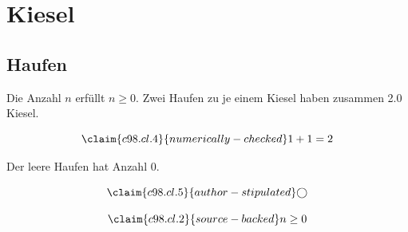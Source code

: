 \chapter{Kiesel}\label{c98}
\section{Haufen}\label{c98.s1}

\begin{theorem}[Anzahl]\label{c98.thm.count}
  Die Anzahl $n$ erfüllt $n \geq 0$.
  Zwei Haufen zu je einem Kiesel haben zusammen
  \num[c98.cl.5]{2.0}{} Kiesel.
\end{theorem}

\begin{equation}\label{c98.eq.sum}\claim{c98.cl.4}{numerically-checked}
  1 + 1 = 2
\end{equation}

\begin{lemma}[Leer]\label{c98.lem.empty}
  Der leere Haufen hat Anzahl $0$.
\end{lemma}

\begin{equation}\label{c98.eq.circle}\claim{c98.cl.5}{author-stipulated}
  \bigcirc
\end{equation}

\begin{vertiefung}[id=c98.v1, titel={T}, wozu={W}, voraussetzung={V}, zurueck={Z}]
  \begin{equation}\label{c98.eq.page}\claim{c98.cl.2}{source-backed}
    n \geq 0
  \end{equation}
\end{vertiefung}
